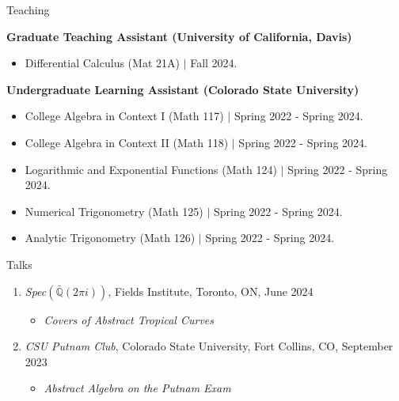 \documentclass[
	11pt, %
]{resume} %
\newcommand{\Q}{\mathbb{Q}}
\begin{document}
\begin{rSection}{Teaching}


	\textbf{Graduate Teaching Assistant (University of California, Davis)}
	\begin{itemize}
		\item{Differential Calculus (Mat 21A) $\mid$ Fall 2024.}
	\end{itemize}

	\textbf{Undergraduate Learning Assistant (Colorado State University)}
	\begin{itemize}
		\item{College Algebra in Context I (Math 117)  $\mid$ Spring 2022 - Spring 2024.}
		\item{College Algebra in Context II (Math 118) $\mid$ Spring 2022 - Spring 2024.}
		\item{Logarithmic and Exponential Functions (Math 124) $\mid$ Spring 2022 - Spring 2024.}
		\item{Numerical Trigonometry (Math 125) $\mid$ Spring 2022 - Spring 2024.}
		\item{Analytic Trigonometry (Math 126) $\mid$ Spring 2022 - Spring 2024.}\\
	\end{itemize}
	
\end{rSection}


\begin{rSection}{Talks}

	\begin{enumerate}

		\item \textit{Spec}$(\bar{\Q}(2\pi i))$, Fields Institute, Toronto, ON, June 2024
		\begin{itemize}
			\item \textit{Covers of Abstract Tropical Curves}
		\end{itemize}

		\item \textit{CSU Putnam Club}, Colorado State University, Fort Collins, CO, September 2023
		\begin{itemize}
			\item \textit{Abstract Algebra on the Putnam Exam}\\
		\end{itemize}

	\end{enumerate}
	
\end{rSection}
\end{document}

